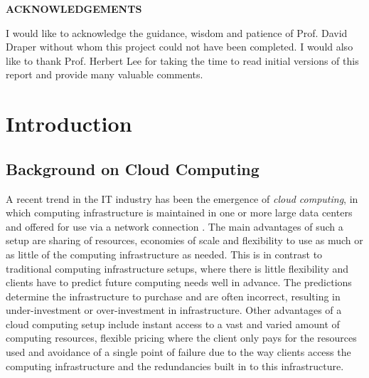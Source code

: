 \documentclass[12pt]{report}
\begin{document}
\setcounter{page}{2}

\newpage

\mbox{}

\newpage
\begin{center} \textbf{\large ACKNOWLEDGEMENTS} \end{center}
\bigskip
\noindent
I would like to acknowledge the guidance, wisdom and patience of Prof. David Draper without whom this project could not have been completed. I would also like to thank Prof. Herbert Lee for taking the time to read initial versions of this report and provide many valuable comments.

\newpage

\singlespacing

\tableofcontents

\setcounter{tocdepth}{2}

\listoftables

\listoffigures

\newpage
\renewcommand{\nomname}{Notation}
\printnomenclature

\newpage
{}

\chapter{Introduction}

\section{Background on Cloud Computing}

A recent trend in the IT industry has been the emergence of \textit{cloud computing}, in which computing infrastructure is maintained in one or more large data centers and offered for use via a network connection \cite{Interoute:WhatIsCloudComputing}.
The main advantages of such a setup are sharing of resources, economies of scale and flexibility to use as much or as little of the computing infrastructure as needed.
This is in contrast to traditional computing infrastructure setups, where there is little flexibility and clients have to predict future computing needs well in advance.
The predictions determine the infrastructure to purchase and are often incorrect, resulting in under-investment or over-investment in infrastructure.
Other advantages of a cloud computing setup include instant access to a vast and varied amount of computing resources, flexible pricing where the client only pays for the resources used and avoidance of a single point of failure due to the way clients access the computing infrastructure and the redundancies built in to this infrastructure.
\end{document}

